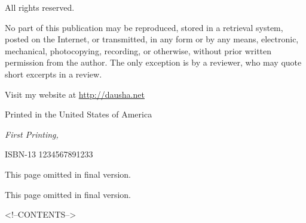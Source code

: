 \documentclass[letterpaper,10pt,twoside,makeidx]{memoir}
\newcommand{\isbn}{1234567891233}
\begin{document}
  \par\noindent All rights reserved.\newline

  \par\noindent No part of this publication may be reproduced, stored in a retrieval system, posted on the Internet, or transmitted, in any form or by any means, electronic, mechanical, photocopying, recording, or otherwise, without prior written permission from the author. The only exception is by a reviewer, who may quote short excerpts in a review.\newline

  \par\noindent \theauthor
  \par\noindent Visit my website at \url{http://dausha.net}\newline

  \par\noindent Printed in the United States of America
  \newline

  \par\noindent\textit{First Printing, \usmonthyear{}}
  \newline
  
  \par\noindent ISBN-13 \isbn
  \vspace*{\fill}
  \newpage

%
\ifdefined\isfinal
\else
  
  This page omitted in final version.
  
  \listoftodos
  \newpage
  This page omitted in final version.
  \tableofcontents
  \newpage
\fi

<!--CONTENTS-->
\end{document}
